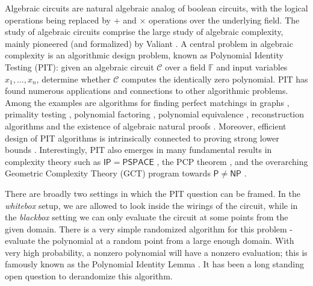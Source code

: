 \documentclass[10pt,a4paper]{article}
\newcommand{\IP}{\mathsf{IP}}
\newcommand{\PSPACE}{\mathsf{PSPACE}}
\renewcommand{\P}{\mathsf{P}}
\newcommand{\NP}{\mathsf{NP}}
\newcommand{\F}{\mathbb{F}}
\newcommand{\calC}{\mathcal{C}}
\numberwithin{equation}{section}
\begin{document}
Algebraic circuits are natural algebraic analog of boolean circuits, with the logical operations being replaced by $+$ and $\times$ operations over the underlying field. The study of algebraic circuits comprise the large study of algebraic complexity, mainly pioneered (and formalized) by Valiant \cite{valiant1979completeness}. A central problem in algebraic complexity is an algorithmic design problem, known as Polynomial Identity Testing (PIT): given an algebraic circuit $\calC$ over a field $\F$ and input variables $x_1,\hdots,x_n$, determine whether $\calC$ computes the identically zero polynomial. PIT has found numerous applications and connections to other algorithmic problems. Among the examples are algorithms for finding perfect matchings in graphs \cite{lovasz1979determinants, DBLP:journals/combinatorica/MulmuleyVV87,fenner2019bipartite}, primality testing \cite{agrawal2004primes}, polynomial factoring \cite{kopparty2014equivalence,dutta2018discovering}, polynomial equivalence \cite{dvir2014testing}, reconstruction algorithms \cite{klivans2006learning,shpilka2009interpolation,karnin2009reconstruction} and the existence of algebraic natural proofs \cite{chatterjee2020existence,kumar2020if}. Moreover, efficient design of PIT algorithms is intrinsically connected to proving strong lower bounds \cite{heintz1980testing,agrawal2005proving,kabanets2004derandomizing,dvir2010hardness,forbes2018succinct,chou2018hardness,dutta_et_al:LIPIcs.ITCS.2021.23}. Interestingly, PIT also emerges in many fundamental results in complexity theory such as $\IP=\PSPACE$ \cite{shamir1992ip,lund1992algebraic}, the PCP theorem \cite{arora1998proof,arora1998probabilistic}, and the overarching Geometric Complexity Theory (GCT) program towards $\P\ne\NP$ \cite{mulmuley2012gct,mulmuley2012geometric, grochow2015unifying,joshua16boundaries}. 

There are broadly two settings in which the PIT question can be framed. In the \emph{whitebox} setup, we are allowed to look inside the wirings of the circuit, while in the \emph{blackbox} setting we can only evaluate the circuit at some points from the given domain. There is a very simple randomized algorithm for this problem - evaluate the polynomial at a random point from a large enough domain. With very high probability, a nonzero polynomial will have a nonzero evaluation; this is famously known as the Polynomial Identity Lemma \cite{ore1922hohere,DL78,Zip79,schwartz1980fast}. It has been a
long standing open question to derandomize this algorithm.
\end{document}
